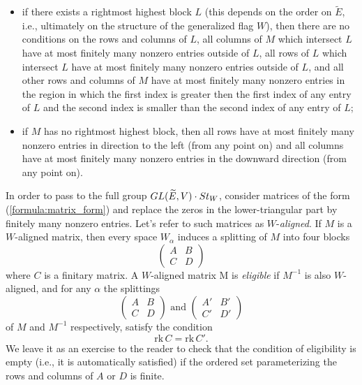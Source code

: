 \documentclass[11pt, a4paper]{article}
\begin{document}
\begin{itemize}
    \item if there exists a rightmost highest  block $L$ (this depends on the %
    order on $\widetilde{E}$, i.e., ultimately on the structure of the generalized flag $W$), then there are no conditions on the rows and columns of $L$, all columns of $M$ which intersect  $L$ have at most finitely many nonzero entries outside of $L$, all rows of $L$ which intersect $L$ have at most finitely many nonzero entries outside of $L$, and all other rows and columns of $M$ have at most finitely many nonzero entries in the region %
    in which the first index is greater then the first index of any entry of $L$ and the second index is smaller than the second index of any entry of $L$;
    \item if $M$ has no rightmost highest block, then all rows %
    have at most finitely many nonzero entries in  direction to the left (from any point on) and all columns %
    have at most finitely many nonzero entries in the downward direction  (from any point on).
\end{itemize}

In order to pass to the full group $GL(\widetilde{E},V) \cdot St_W$, consider matrices of the form (\ref{formula:matrix_form}) and replace the zeros in the lower-triangular part by finitely many nonzero entries. Let's refer to such matrices as $W$-\emph{aligned}. If $M$ is a $W$-aligned matrix, then every space $W_\alpha$ induces a splitting of $M$ into four blocks \begin{equation}\label{formula:splitting_depends_on_alpha}
    \left(\begin{array}{c|c}
A & B  \\
\hline
C & D  \end{array}\right)
\end{equation}
 where $C$ is a finitary matrix. A $W$-aligned matrix M is \emph{eligible} if $M^{-1}$ is also $W$-aligned, and for any $\alpha$ the splittings 
 \begin{equation*}
    \left(\begin{array}{c|c}
A & B  \\
\hline
C & D  \end{array}\right)\text{ and }     \left(\begin{array}{c|c}
A' & B'  \\
\hline
C' & D'  \end{array}\right)
\end{equation*}
of $M$ and $M^{-1}$ respectively, satisfy the condition \begin{equation*}
    \mathrm{rk}\,C=\mathrm{rk}\,C'.
\end{equation*} 
We leave it as an exercise to the reader to check that the condition of eligibility is empty (i.e., it is automatically satisfied) if the ordered set parameterizing the rows and columns of $A$ or $D$ is finite.
 
\end{document}
